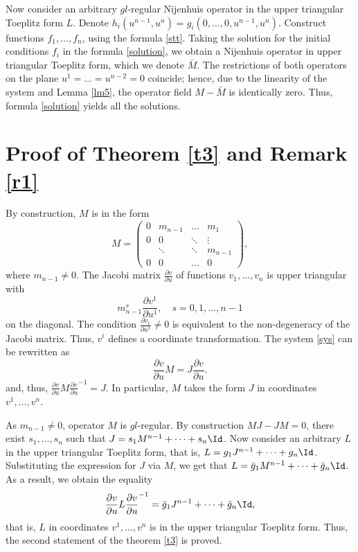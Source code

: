 \documentclass[12pt]{article}
\theoremstyle{remark}
\newcommand{\pd}[2]{\frac{\partial#1}{\partial#2}}
\begin{document}
Now consider an arbitrary $gl$-regular Nijenhuis operator in the upper triangular Toeplitz form $L$. Denote $h_i(u^{n - 1}, u^n) = g_i(0, \dots, 0, u^{n - 1}, u^n)$. Construct functions $f_1, \dots, f_n$, using the formula \eqref{stt}. Taking the solution for the initial conditions $f_i$ in the formula \eqref{solution}, we obtain a Nijenhuis operator in upper triangular Toeplitz form, which we denote $\bar M$. The restrictions of both operators on the plane $u^1 = \dots = u^{n - 2} = 0$ coincide; hence, due to the linearity of the system and Lemma \ref{lm5}, the operator field $M - \bar M$ is identically zero. Thus, formula \eqref{solution} yields all the solutions.



\section{Proof of Theorem \ref{t3} and Remark \ref{r1}}\label{proof3}

By construction, $M$ is in the form
$$
M = \left( \begin{array}{cccc}
     0 & m_{n - 1} & \dots & m_1  \\
     0 & 0 & \ddots & \vdots \\
     & \ddots &\ddots  & m_{n - 1}\\
     0 & 0 & \dots  & 0
\end{array}\right),
$$
where $m_{n - 1} \neq 0$. The Jacobi matrix $\pd{v}{u}$ of functions $v_1, \dots, v_n$ is upper triangular with 
$$
m_{n - 1}^s \pd{v^1}{u^1}, \quad s = 0, 1, \dots, n - 1
$$
on the diagonal. The condition $\pd{v_1}{u^1} \neq 0$ is equivalent to the non-degeneracy of the Jacobi matrix. Thus, $v^i$ defines a coordinate transformation. The system \eqref{sys} can be rewritten as
$$
\pd{v}{u} M = J \pd{v}{u}.
$$
and, thus, $\pd{v}{u} M \pd{v}{u}^{-1} = J$. In particular, $M$ takes the form $J$ in coordinates $v^1, \dots, v^n$.

As $m_{n - 1} \neq 0$, operator $M$ is $gl$-regular. By construction $MJ - JM = 0$, there exist $s_1, \dots, s_n$ such that $J = s_1 M^{n - 1} + \dots + s_n \Id$. Now consider an arbitrary $L$ in the upper triangular Toeplitz form, that is, $L = g_1 J^{n - 1} + \dots + g_n \Id$. Substituting the expression for $J$ via $M$, we get that $L = \bar g_1 M^{n - 1} + \dots + \bar g_n \Id$. As a result, we obtain the equality
$$
\pd{v}{u} L \pd{v}{u}^{-1} = \bar g_1 J^{n - 1} + \dots + \bar g_n \Id,
$$
that is, $L$ in coordinates $v^1, \dots, v^n$ is in the upper triangular Toeplitz form. Thus, the second statement of the theorem \ref{t3} is proved.
\end{document}
